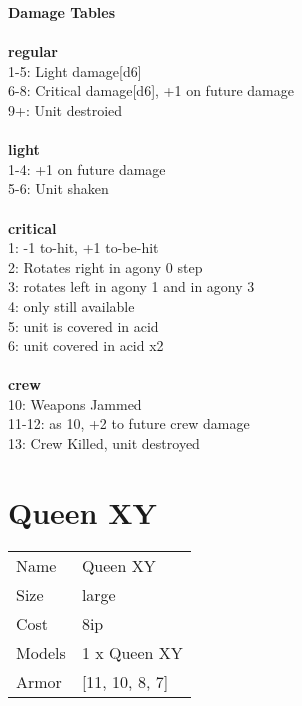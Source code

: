 {\bf Damage Tables} \\
\ \\ {\bf regular } \\
1-5: Light damage[d6] \\
6-8: Critical damage[d6], +1 on future damage \\
9+: Unit destroied \\
\ \\ {\bf light } \\
1-4: +1 on future damage \\
5-6: Unit shaken \\
\ \\ {\bf critical } \\
1: -1 to-hit, +1 to-be-hit \\
2: Rotates right in agony 0 step \\
3: rotates left in agony 1 and in agony 3 \\
4: only still available \\
5: unit is covered in acid \\
6: unit covered in acid x2 \\
\ \\ {\bf crew } \\
10: Weapons Jammed \\
11-12: as 10, +2 to future crew damage \\
13: Crew Killed, unit destroyed \\










\pagebreak\pagebreak

\section{ Queen XY }

\begin{tabular}{ll}
  Name & Queen XY \\
  Size & large\\
  Cost & 8ip\\
  Models & 1 x Queen XY\\
  Armor & [11, 10, 8, 7]\\
\end{tabular}

\noindent 

